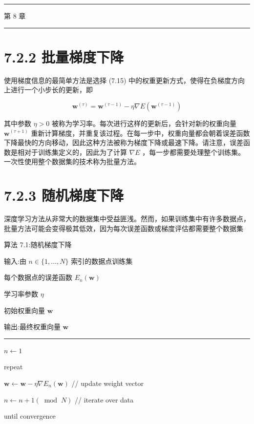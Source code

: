 \documentclass[10pt]{article}
\newcommand{\HRule}{\begin{center}\rule{0.9\linewidth}{0.2mm}\end{center}}
\begin{document}
\HRule

第 8 章

\HRule

\section*{7.2.2 批量梯度下降}

使用梯度信息的最简单方法是选择 (7.15) 中的权重更新方式，使得在负梯度方向上进行一个小步长的更新，即

\[
{\mathbf{w}}^{\left( \tau \right) } = {\mathbf{w}}^{\left( \tau  - 1\right) } - \eta \nabla E\left( {\mathbf{w}}^{\left( \tau  - 1\right) }\right)  \tag{7.16}
\]

其中参数 \(\eta  > 0\) 被称为学习率。每次进行这样的更新后，会针对新的权重向量 \({\mathbf{w}}^{\left( \tau  + 1\right) }\) 重新计算梯度，并重复该过程。在每一步中，权重向量都会朝着误差函数下降最快的方向移动，因此这种方法被称为梯度下降或最速下降。请注意，误差函数是相对于训练集定义的，因此为了计算 \(\nabla E\) ，每一步都需要处理整个训练集。一次性使用整个数据集的技术称为批量方法。

\section*{7.2.3 随机梯度下降}

深度学习方法从非常大的数据集中受益匪浅。然而，如果训练集中有许多数据点，批量方法可能会变得极其低效，因为每次误差函数或梯度评估都需要整个数据集

算法 7.1:随机梯度下降

输入:由 \(n \in  \{ 1,\ldots ,N\}\) 索引的数据点训练集

每个数据点的误差函数 \({E}_{n}\left( \mathbf{w}\right)\)

学习率参数 \(\eta\)

初始权重向量 \(\mathbf{w}\)

输出:最终权重向量 \(\mathbf{w}\)

\HRule

\(n \leftarrow  1\)

repeat

\hspace*{1em} \(\mathbf{w} \leftarrow  \mathbf{w} - \eta \nabla {E}_{n}\left( \mathbf{w}\right)\) // update weight vector

\hspace*{1em} \(n \leftarrow  n + 1\left( {\;\operatorname{mod}\;N}\right)\) // iterate over data

until convergence
\end{document}
